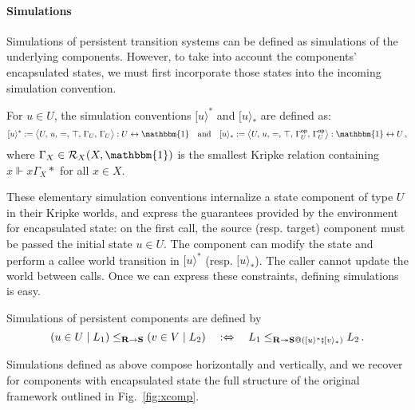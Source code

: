 \documentclass[acmsmall,screen,review,anonymous,nonacm]{acmart}
\newcommand{\kw}[1]{\ensuremath{ \mathsf{#1} }}
\newcommand{\vcomp}{\fatsemi}
\begin{document}
\paragraph{Simulations} %

Simulations of persistent transition systems
can be defined as simulations of the underlying components.
However,
to take into account the components' encapsulated states,
we must first incorporate those states into
the incoming simulation convention.

\begin{definition}
For $u \in U$,
the simulation conventions
$[ u \rangle^*$ and
$[ u \rangle_*$ are defined as:
\[
  [ u \rangle^* :=
    \big\langle U,\, u,\, {=},\, \top,\, \Gamma_U,\, \Gamma_U \big\rangle
    : U \leftrightarrow \mathbbm{1}
  \quad \text{and} \quad
  [ u \rangle_* :=
    \big\langle U,\, u,\, {=},\, \top,\, \Gamma_U^\kw{op},\, \Gamma_U^\kw{op} \big\rangle
    : \mathbbm{1} \leftrightarrow U
  \,,
\]
where $\Gamma_X \in \mathcal{R}_X(X, \mathbbm{1})$
is the smallest Kripke relation containing $x \Vdash x \mathrel{\Gamma_X} *$ for all $x \in X$.
\end{definition}

These elementary simulation conventions
internalize a state component of type $U$ in their Kripke worlds,
and express the guarantees provided by the environment
for encapsulated state:
on the first call, the source (resp. target) component
must be passed the initial state $u \in U$.
The component can modify the state
and perform a callee world transition
in $[ u \rangle^*$ (resp. $[ u \rangle_*$).
The caller cannot update the world between calls.
Once we can express these constraints,
defining simulations is easy.

\begin{definition} \label{def:ssim} %
Simulations of persistent components are defined by
\[
  (u \in U \mid L_1)
  \le_{\mathbf{R} \rightarrow \mathbf{S}}
  (v \in V \mid L_2)
  \quad:\Leftrightarrow\quad
  L_1
  \le_{\mathbf{R} \twoheadrightarrow
       \mathbf{S} \mathbin@ ([ u \rangle^* \vcomp [ v \rangle_*)}
  L_2
  \,.
\]
\end{definition}

Simulations defined as above compose horizontally and vertically,
and we recover for components with encapsulated state
the full structure of the original framework
outlined in Fig.~\ref{fig:xcomp}.


\end{document}
